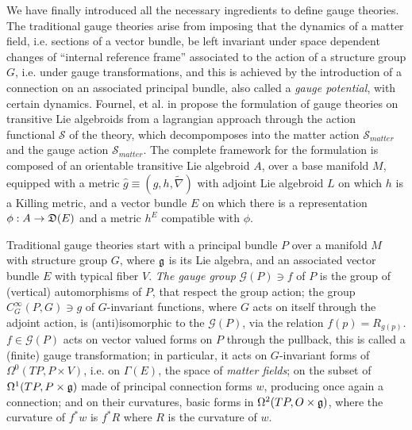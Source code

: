 We have finally introduced all the necessary ingredients to define gauge theories. The traditional gauge theories arise from imposing that the dynamics of a matter field, i.e. sections of a vector bundle, be left invariant under space dependent changes of ``internal reference frame'' associated to the action of a structure group $G$, i.e. under gauge transformations, and this is achieved by the introduction of a connection on an associated principal bundle, also called a \emph{gauge potential}, with certain dynamics. Fournel, et al. in \cite{} propose the formulation of gauge theories on transitive Lie algebroids from a lagrangian approach through the action functional $\mathcal S$ of the theory, which decompomposes into the matter action $\mathcal S_{matter}$ and the gauge action $\mathcal S_{matter}$. The complete framework for the formulation is composed of an orientable transitive Lie algebroid $A$, over a base manifold $M$, equipped with a metric $\hat g \equiv (g, h, \tilde \nabla)$ with adjoint Lie algebroid $L$ on which $h$ is a Killing metric, and a vector bundle $E$ on which there is a representation $\phi: A \to \alg D(E)$ and a metric $h^E$ compatible with $\phi$.

Traditional gauge theories start with a principal bundle $P$  over a manifold $M$ with structure group $G$, where $\mathfrak{g}$ is its Lie algebra, and an associated vector bundle $E$ with typical fiber $V$. \emph{The gauge group} $\mathcal G(P) \ni f$ of $P$ is the group of (vertical) automorphisms of $P$, that respect the group action; the group $C^\infty_G(P, G) \ni g$ of $G$-invariant functions, where $G$ acts on itself through the adjoint action, is (anti)isomorphic to the $\mathcal G(P)$, via the relation $f(p) = R_{g(p)}$. $f\in \mathcal G(P)$ acts on vector valued forms on $P$ through the pullback, this is called a (finite) gauge transformation; in particular, it acts on $G$-invariant forms of $\Omega^0(TP, P \times V)$, i.e. on $\Gamma(E)$, the space of \emph{matter fields}; on the subset of $\Omega^1(TP, P \times \mathfrak{g})$ made of principal connection forms $w$, producing once again a connection; and on their curvatures, basic forms in $\Omega^2(TP, O \times \mathfrak{g})$, where the curvature of $f^*w$ is $f^*R$ where $R$ is the curvature of $w$.

